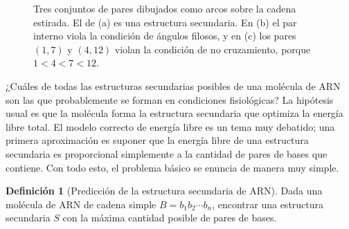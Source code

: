 \documentclass[12pt, spanish, oneside, openany]{book}
\theoremstyle{uprightplain}
\theoremstyle{definition}
\newtheorem{definicion}[teorema]{Definición}
\theoremstyle{remark}
\theoremstyle{definition}
\begin{document}
\begin{figure}[H]
\centering
{}
\caption{Tres conjuntos de pares dibujados como arcos sobre la cadena
estirada. El de (a) es una estructura secundaria. En (b) el par interno
viola la condición de ángulos filosos, y en (c) los pares $(1,7)$ y $(4,12)$
violan la condición de no cruzamiento, porque $1<4<7<12$.}
\label{fig:dp-arn-condiciones}
\end{figure}

¿Cuáles de todas las estructuras secundarias posibles de una molécula de ARN son las que probablemente se forman en condiciones fisiológicas? La hipótesis usual es que la molécula forma la estructura secundaria que optimiza la energía libre total. El modelo correcto de energía libre es un tema muy debatido; una primera aproximación es suponer que la energía libre de una estructura secundaria es proporcional simplemente a la cantidad de pares de bases que contiene. Con todo esto, el problema básico se enuncia de manera muy simple.

\begin{definicion}[Predicción de la estructura secundaria de ARN]
\label{def:dp-arn}
Dada una molécula de ARN de cadena simple $B=b_1b_2\cdots b_n$, encontrar una estructura secundaria $S$ con la máxima cantidad posible de pares de bases.
\end{definicion}
\end{document}
